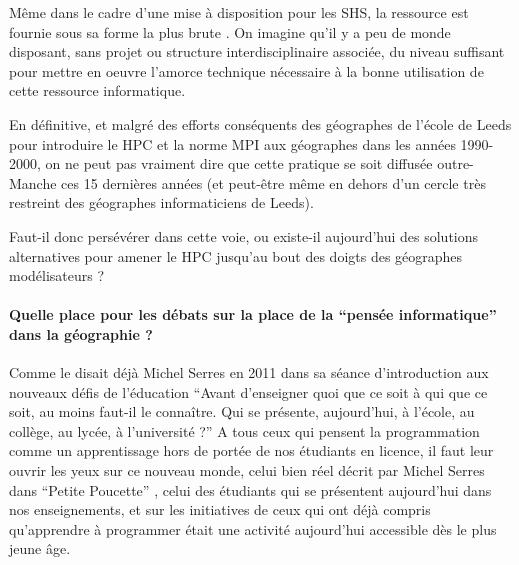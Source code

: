 Même dans le cadre d'une mise à disposition pour les SHS, la ressource est fournie sous sa forme la plus brute . On imagine qu'il y a peu de monde disposant, sans projet ou structure interdisciplinaire associée, du niveau suffisant pour mettre en oeuvre l'amorce technique nécessaire à la bonne utilisation de cette ressource informatique.

En définitive, et malgré des efforts conséquents des géographes de l'école de Leeds \autocite{Openshaw2000} pour introduire le HPC et la norme MPI aux géographes dans les années 1990-2000, on ne peut pas vraiment dire que cette pratique se soit diffusée outre-Manche ces 15 dernières années (et peut-être même en dehors d'un cercle très restreint des géographes informaticiens de Leeds).

Faut-il donc persévérer dans cette voie, ou existe-il aujourd'hui des solutions alternatives pour amener le HPC jusqu'au bout des doigts des géographes modélisateurs ?







\paragraph{Quelle place pour les débats sur la place de la \enquote{pensée informatique} dans la géographie ?}
\label{p:Tournantenseignements}

Comme le disait déjà Michel Serres en 2011 dans sa séance d'introduction aux nouveaux défis de l'éducation \enquote{Avant d’enseigner quoi que ce soit à qui que ce soit, au moins faut-il le connaître. Qui se présente, aujourd’hui, à l’école, au collège, au lycée, à l’université ?} \autocite{Serres2011} A tous ceux qui pensent la programmation comme un apprentissage hors de portée de nos étudiants en licence, il faut leur ouvrir les yeux sur ce nouveau monde, celui bien réel décrit par Michel Serres dans \enquote{Petite Poucette} \autocite{Serres2012}, celui des étudiants qui se présentent aujourd'hui dans nos enseignements, et sur les initiatives de ceux qui ont déjà compris qu'apprendre à programmer était une activité aujourd'hui accessible dès le plus jeune âge.

